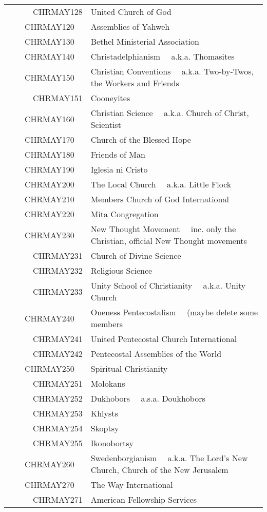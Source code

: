 \documentclass[12pt]{article}
\begin{document}
\begin{tiny}
\begin{center}
\begin{longtable}{|l|l|}
~~~~~~CHRMAY128 & United Church of God \\
~~~~CHRMAY120 & Assemblies of Yahweh \\
~~~~CHRMAY130 & Bethel Ministerial Association \\
~~~~CHRMAY140 & Christadelphianism	~~a.k.a. Thomasites \\
~~~~CHRMAY150 & Christian Conventions	~~a.k.a. Two-by-Twos, the Workers and Friends \\
~~~~~~CHRMAY151 & Cooneyites \\
~~~~CHRMAY160 & Christian Science	~~a.k.a. Church of Christ, Scientist \\
~~~~CHRMAY170 & Church of the Blessed Hope \\
~~~~CHRMAY180 & Friends of Man \\
~~~~CHRMAY190 & Iglesia ni Cristo \\
~~~~CHRMAY200 & The Local Church	~~a.k.a. Little Flock \\
~~~~CHRMAY210 & Members Church of God International \\
~~~~CHRMAY220 & Mita Congregation \\
~~~~CHRMAY230 & New Thought Movement	~~inc. only the Christian, official New Thought movements \\
~~~~~~CHRMAY231 & Church of Divine Science \\
~~~~~~CHRMAY232 & Religious Science \\
~~~~~~CHRMAY233 & Unity School of Christianity	~~a.k.a. Unity Church \\
~~~~CHRMAY240 & Oneness Pentecostalism	~~(maybe delete some members \\
~~~~~~CHRMAY241 & United Pentecostal Church International \\
~~~~~~CHRMAY242 & Pentecostal Assemblies of the World \\
~~~~CHRMAY250 & Spiritual Christianity \\
~~~~~~CHRMAY251 & Molokans \\
~~~~~~CHRMAY252 & Dukhobors	~~a.s.a. Doukhobors \\
~~~~~~CHRMAY253 & Khlysts \\
~~~~~~CHRMAY254 & Skoptsy \\
~~~~~~CHRMAY255 & Ikonobortsy \\
~~~~CHRMAY260 & Swedenborgianism	~~a.k.a. The Lord's New Church, Church of the New Jerusalem \\
~~~~CHRMAY270 & The Way International \\
~~~~~~CHRMAY271 & American Fellowship Services \\

\end{longtable}
\end{center}
\end{tiny}
\end{document}
